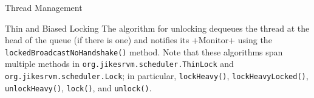 \begin{section}{Thread Management}
\begin{subsection}{Thin and Biased Locking}
The algorithm for unlocking dequeues the thread at the head of the queue (if there is one) and notifies its \spverb+Monitor+ using the \texttt{locked\-Broad\-cast\-No\-Hand\-sha\-ke()} method. Note that these algorithms span multiple methods in \texttt{org.jikes\-rvm.sche\-du\-ler.Thin\-Lock} and \texttt{org.jikes\-rvm.sche\-du\-ler.Lock}; in particular, \texttt{lock\-Heavy()}, \texttt{lock\-Hea\-vy\-Locked()}, \texttt{un\-lock\-Hea\-vy()}, \texttt{lock()}, and \texttt{un\-lock()}.

\end{subsection}

\end{section}
